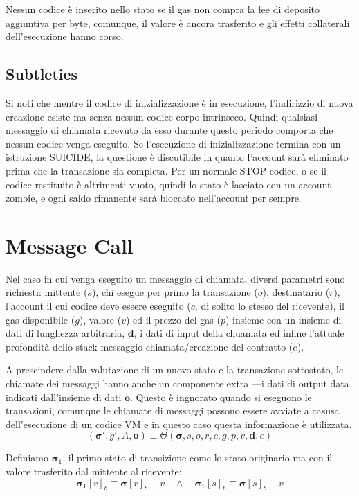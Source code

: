 \documentclass[9pt,oneside]{amsart}
\begin{document}
\begin{multicols}{2}
Nessun codice è inserito nello stato se il gas non compra la fee di deposito aggiuntiva per byte, comunque, il valore è ancora trasferito e gli effetti collaterali dell'esecuzione hanno corso.

\subsection{Subtleties}
Si noti che mentre il codice di inizializzazione è in esecuzione, l'indirizzio di nuova creazione esiste ma senza nessun codice corpo intrinseco. Quindi qualsiasi messaggio di chiamata ricevuto da esso durante questo periodo comporta che nessun codice venga eseguito. Se l'esecuzione di inizializzazione termina con un istruzione {\small SUICIDE}, la questione è discutibile in quanto l'account sarà eliminato prima che la transazione sia completa. Per un normale {\small STOP} codice, o se il codice restituito è altrimenti vuoto, quindi lo stato è lasciato con un account zombie, e ogni saldo rimanente sarà bloccato nell'account per sempre.

\section{Message Call} \label{ch:call}
Nel caso in cui venga eseguito un messaggio di chiamata, diversi parametri sono richiesti: mittente ($s$), chi esegue per primo la transazione ($o$), destinatario ($r$), l'account il cui codice deve essere eseguito ($c$, di solito lo stesso del ricevente), il gas disponibile ($g$), valore ($v$) ed il prezzo del gas ($p$) insieme con un insieme di dati di lunghezza arbitraria, $\mathbf{d}$, i dati di input della chuamata ed infine l'attuale profondità dello stack messaggio-chiamata/creazione del contratto ($e$).

A prescindere dalla valutazione di un nuovo stato e la transazione sottostato, le chiamate dei messaggi hanno anche un componente extra ---i dati di output data indicati dall'insieme di dati  $\mathbf{o}$. Questo è ingnorato quando si eseguono le transazioni, comunque le chiamate di messaggi possono essere avviate a casusa dell'esecuzione di un codice VM e in questo caso questa informazione è utilizzata.
\begin{equation}
(\boldsymbol{\sigma}', g', A, \mathbf{o}) \equiv \Theta(\boldsymbol{\sigma}, s, o, r, c, g, p, v, \mathbf{d}, e)
\end{equation}

Definiamo $\boldsymbol{\sigma}_1$, il primo stato di transizione come lo stato originario ma con il valore trasferito dal mittente al ricevente:
\begin{equation}
\boldsymbol{\sigma}_1[r]_b \equiv \boldsymbol{\sigma}[r]_b + v \quad\wedge\quad \boldsymbol{\sigma}_1[s]_b \equiv \boldsymbol{\sigma}[s]_b - v
\end{equation}


\end{multicols}
\end{document}
